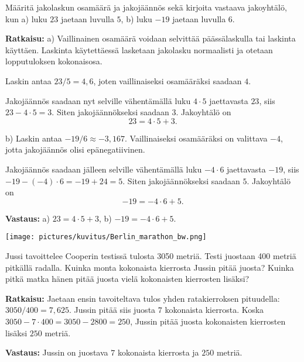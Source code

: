 \begin{esimerkki}
Määritä jakolaskun osamäärä ja jakojäännös sekä kirjoita vastaava jakoyhtälö, kun
a) luku $23$ jaetaan luvulla $5$,  b)  luku $-19$ jaetaan luvulla $6$.

{\bf Ratkaisu:}
a) Vaillinainen osamäärä voidaan selvittää päässälaskulla tai laskinta käyttäen. Laskinta käytettäessä lasketaan jakolasku normaalisti ja otetaan lopputuloksen kokonaisosa.

Laskin antaa $23/5 = 4,6$, joten vaillinaiseksi osamääräksi saadaan $4$.

Jakojäännös saadaan nyt selville vähentämällä luku $4\cdot 5$ jaettavasta $23$, siis $23-4\cdot 5=3$. Siten jakojäännökseksi saadaan $3$. 
Jakoyhtälö on
\[
23 = 4\cdot 5 + 3.
\]

b) Laskin antaa $-19/6 \approx -3,167$. Vaillinaiseksi osamääräksi on valittava $-4$, jotta jakojäännös olisi epänegatiivinen.

Jakojäännös saadaan jälleen selville vähentämällä luku $-4\cdot 6$ jaettavasta $-19$, siis $-19-(-4)\cdot 6=-19+24=5$. Siten jakojäännökseksi saadaan $5$. 
Jakoyhtälö on
\[
-19 = -4\cdot 6 +5.
\]

{\bf Vastaus:} a) $23 = 4\cdot 5 + 3$, b) $-19 = -4\cdot 6 +5$.
\end{esimerkki}

\bigskip

\begin{center}
\texttt{[image: pictures/kuvitus/Berlin\_marathon\_bw.png]}
\end{center}


\begin{esimerkki}
Jussi tavoittelee Cooperin testissä tulosta 3050 metriä. Testi juostaan 400 metriä pitkällä
radalla. Kuinka monta kokonaista kierrosta Jussin pitää juosta? Kuinka pitkä matka
hänen pitää juosta vielä kokonaisten kierrosten lisäksi?

{\bf Ratkaisu:}
Jaetaan ensin tavoiteltava tulos yhden ratakierroksen pituudella:
$3050  / 400  = 7,625$. Jussin pitää siis juosta $7$ kokonaista kierrosta.
Koska $3050  - 7 \cdot 400 = 3050  - 2800  = 250$, Jussin pitää juosta kokonaisten kierrosten lisäksi $250$ metriä.

{\bf Vastaus:} Jussin on juostava $7$ kokonaista kierrosta ja $250$ metriä.
\end{esimerkki}

